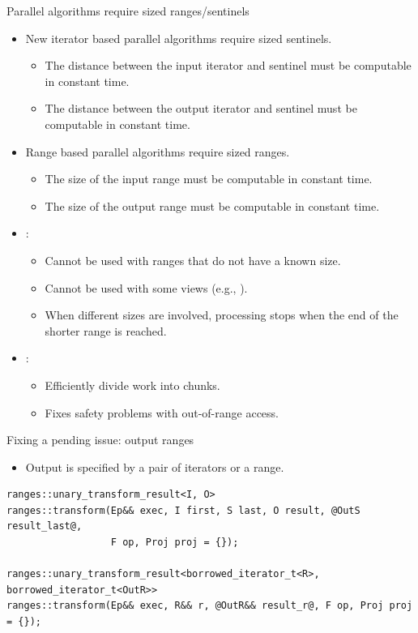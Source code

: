 \begin{frame}[t,fragile]{Parallel algorithms require sized ranges/sentinels}
\begin{itemize}
  \item New iterator based parallel algorithms require sized sentinels.
    \begin{itemize}
      \item The distance between the input iterator and sentinel must be computable in constant time.
      \item The distance between the output iterator and sentinel must be computable in constant time.
    \end{itemize}

  \item Range based parallel algorithms require sized ranges.
    \begin{itemize}
      \item The size of the input range must be computable in constant time.
      \item The size of the output range must be computable in constant time.
    \end{itemize}

  \item {}:
    \begin{itemize}
      \item Cannot be used with ranges that do not have a known size.
      \item Cannot be used with some views (e.g., ).
      \item When different sizes are involved, processing stops when the end of the shorter range is reached.
    \end{itemize}

  \item {}:
    \begin{itemize}
        \item Efficiently divide work into chunks.
        \item Fixes safety problems with out-of-range access.
    \end{itemize}
\end{itemize}
\end{frame}

\begin{frame}[t,fragile]{Fixing a pending issue: output ranges}
\begin{itemize}
  \item Output is specified by a pair of iterators or a range.
\end{itemize}
  
\begin{lstlisting}
ranges::unary_transform_result<I, O>
ranges::transform(Ep&& exec, I first, S last, O result, @OutS result_last@,
                  F op, Proj proj = {});

ranges::unary_transform_result<borrowed_iterator_t<R>, borrowed_iterator_t<OutR>>
ranges::transform(Ep&& exec, R&& r, @OutR&& result_r@, F op, Proj proj = {});
\end{lstlisting}
\end{frame}